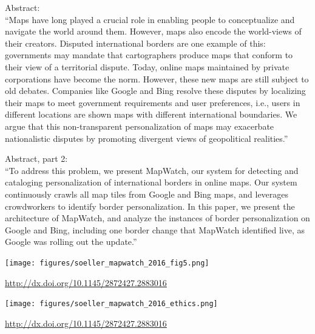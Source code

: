 \documentclass{beamer}
\begin{document}
\begin{frame}

Abstract:\\
``Maps have long played a crucial role in enabling people to conceptualize and navigate the world around them. However, maps also encode the world-views of their creators. Disputed international borders are one example of this: governments may mandate that cartographers produce maps that conform to their view of a territorial dispute. Today, online maps maintained by private corporations have become the norm. However, these new maps are still subject to old debates. Companies like Google and Bing resolve these disputes by localizing their maps to meet government requirements and user preferences, i.e., users in different locations are shown maps with different international boundaries. We argue that this non-transparent personalization of maps may exacerbate nationalistic disputes by promoting divergent views of geopolitical realities.''

\end{frame}
\begin{frame}

Abstract, part 2:\\
``To address this problem, we present MapWatch, our system for detecting and cataloging personalization of international borders in online maps. Our system continuously crawls all map tiles from Google and Bing maps, and leverages crowdworkers to identify border personalization. In this paper, we present the architecture of MapWatch, and analyze the instances of border personalization on Google and Bing, including one border change that MapWatch identified live, as Google was rolling out the update.''

\end{frame}
\begin{frame}

\begin{center}
\texttt{[image: figures/soeller\_mapwatch\_2016\_fig5.png]}
\end{center}

\vfill
\url{http://dx.doi.org/10.1145/2872427.2883016}
\end{frame}
\begin{frame}

\begin{center}
\texttt{[image: figures/soeller\_mapwatch\_2016\_ethics.png]}
\end{center}

\vfill
\url{http://dx.doi.org/10.1145/2872427.2883016}
\end{frame}
\end{document}
